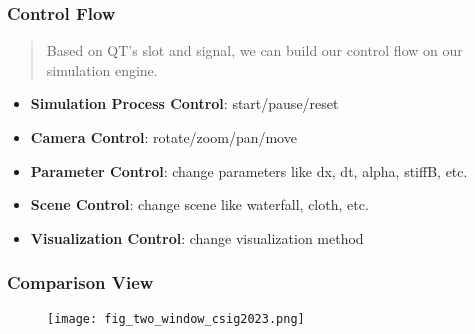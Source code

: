 \begin{frame}
    \frametitle{Control Flow}
    \begin{quote}
        Based on QT's slot and signal, we can build our control flow on our simulation engine.
    \end{quote}
    \begin{itemize}
        \item \textbf{Simulation Process Control}: start/pause/reset
        \item \textbf{Camera Control}: rotate/zoom/pan/move
        \item \textbf{Parameter Control}: change parameters like dx, dt, alpha, stiffB, etc.
        \item \textbf{Scene Control}: change scene like waterfall, cloth, etc.
        \item \textbf{Visualization Control}: change visualization method
    \end{itemize}
\end{frame}

\begin{frame}
    \frametitle{Comparison View}
    \begin{figure}[H]
        \centering
        \texttt{[image: fig\_two\_window\_csig2023.png]}
    \end{figure}
\end{frame}